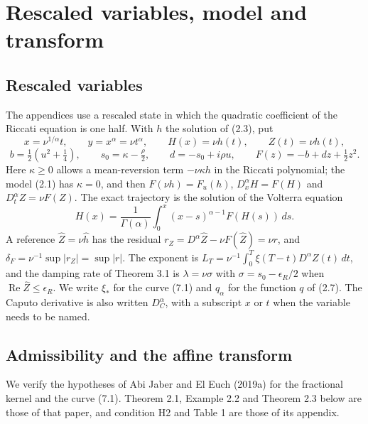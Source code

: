\documentclass[11pt,a4paper]{article}
\begin{document}
\setcounter{section}{0}\section{Rescaled variables, model and transform}

\setcounter{subsection}{0}\subsection{Rescaled variables}

The appendices use a rescaled state in which the quadratic coefficient of the Riccati equation is one half. With \(h\) the solution of (2.3), put
\begin{equation*}\tag{A.1}
x=\nu^{1/\alpha}t,\qquad y=x^\alpha=\nu t^\alpha,\qquad H(x)=\nu h(t),\qquad Z(t)=\nu h(t),
\end{equation*}
\begin{equation*}\tag{A.2}
b=\tfrac12\left(u^2+\tfrac14\right),\qquad s_0=\kappa-\tfrac\rho2,\qquad d=-s_0+i\rho u,\qquad F(z)=-b+dz+\tfrac12z^2 .
\end{equation*}
Here \(\kappa\ge0\) allows a mean-reversion term \(-\nu\kappa h\) in the Riccati polynomial; the model (2.1) has \(\kappa=0\), and then \(F(\nu h)=F_u(h)\), \(D^\alpha_xH=F(H)\) and \(D^\alpha_tZ=\nu F(Z)\). The exact trajectory is the solution of the Volterra equation
\begin{equation*}\tag{A.3}
H(x)=\frac1{\Gamma(\alpha)}\int_0^x(x-s)^{\alpha-1}F(H(s))\,ds .
\end{equation*}
A reference \(\widehat Z=\nu\widehat h\) has the residual \(r_Z=D^\alpha\widehat Z-\nu F(\widehat Z)=\nu r\), and \(\delta_F=\nu^{-1}\sup|r_Z|=\sup|r|\). The exponent is \(L_T=\nu^{-1}\int_0^T\xi(T-t)D^\alpha Z(t)\,dt\), and the damping rate of Theorem 3.1 is \(\lambda=\nu\sigma\) with \(\sigma=s_0-\epsilon_R/2\) when \(\operatorname{Re}\widehat Z\le\epsilon_R\). We write \(\xi_*\) for the curve (7.1) and \(q_\alpha\) for the function \(q\) of (2.7). The Caputo derivative is also written \(D_C^\alpha\), with a subscript \(x\) or \(t\) when the variable needs to be named.

\setcounter{subsection}{1}\subsection{Admissibility and the affine transform}

We verify the hypotheses of Abi Jaber and El Euch (2019a) for the fractional kernel and the curve (7.1). Theorem 2.1, Example 2.2 and Theorem 2.3 below are those of that paper, and condition H2 and Table 1 are those of its appendix.
\end{document}
